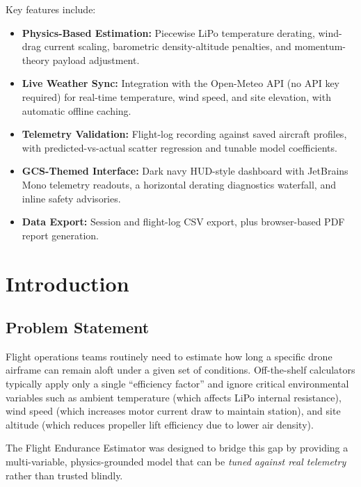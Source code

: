 \documentclass[11pt,a4paper]{article}
\begin{document}
Key features include:
\begin{itemize}[noitemsep]
    \item \textbf{Physics-Based Estimation:} Piecewise LiPo temperature derating, wind-drag current scaling, barometric density-altitude penalties, and momentum-theory payload adjustment.
    \item \textbf{Live Weather Sync:} Integration with the Open-Meteo API (no API key required) for real-time temperature, wind speed, and site elevation, with automatic offline caching.
    \item \textbf{Telemetry Validation:} Flight-log recording against saved aircraft profiles, with predicted-vs-actual scatter regression and tunable model coefficients.
    \item \textbf{GCS-Themed Interface:} Dark navy HUD-style dashboard with JetBrains Mono telemetry readouts, a horizontal derating diagnostics waterfall, and inline safety advisories.
    \item \textbf{Data Export:} Session and flight-log CSV export, plus browser-based PDF report generation.
\end{itemize}

\newpage

\section{Introduction}

\subsection{Problem Statement}
Flight operations teams routinely need to estimate how long a specific drone airframe can remain aloft under a given set of conditions. Off-the-shelf calculators typically apply only a single ``efficiency factor'' and ignore critical environmental variables such as ambient temperature (which affects LiPo internal resistance), wind speed (which increases motor current draw to maintain station), and site altitude (which reduces propeller lift efficiency due to lower air density).

The Flight Endurance Estimator was designed to bridge this gap by providing a multi-variable, physics-grounded model that can be \emph{tuned against real telemetry} rather than trusted blindly.
\end{document}
